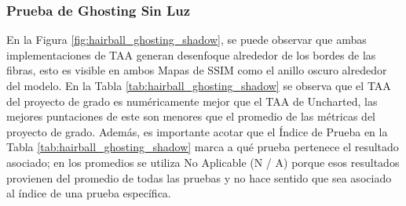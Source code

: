 \documentclass[pregrado]{tesis-usb} %
\begin{document}
\FloatBarrier

\subsubsection{Prueba de Ghosting Sin Luz}
En la Figura \ref{fig:hairball_ghosting_shadow}, se puede observar que ambas implementaciones de TAA generan desenfoque alrededor de los bordes de las fibras, esto es visible en ambos Mapas de SSIM como el anillo oscuro alrededor del modelo. En la Tabla \ref{tab:hairball_ghosting_shadow} se observa que el TAA del proyecto de grado es numéricamente mejor que el TAA de Uncharted, las mejores puntaciones de este son menores que el promedio de las métricas del proyecto de grado. Además, es importante acotar que el Índice de Prueba en la Tabla \ref{tab:hairball_ghosting_shadow} marca a qué prueba pertenece el resultado asociado; en los promedios se utiliza No Aplicable (N / A) porque esos resultados provienen del promedio de todas las pruebas y no hace sentido que sea asociado al índice de una prueba específica. 
\end{document}
